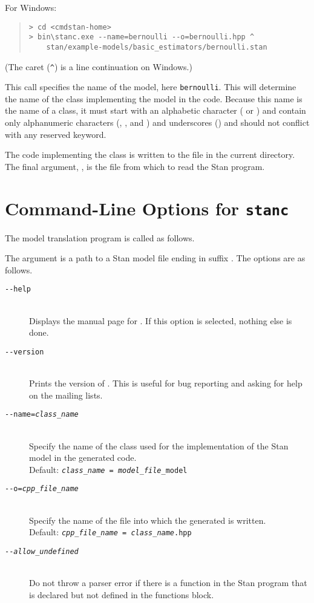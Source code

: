 For Windows:
%
\begin{quote}
\begin{Verbatim}[fontshape=sl]
> cd <cmdstan-home>
> bin\stanc.exe --name=bernoulli --o=bernoulli.hpp ^
    stan/example-models/basic_estimators/bernoulli.stan 
\end{Verbatim}
\end{quote}
%
(The caret (\Verb|^|) is a line continuation on Windows.)

This call specifies the name of the model, here {\tt bernoulli}.
This will determine the name of the class implementing the model in
the \Cpp code.  Because this name is the name of a \Cpp class, it must
start with an alphabetic character ( or ) and
contain only alphanumeric characters (, , and
) and underscores (\code{\_}) and should not conflict with
any \Cpp reserved keyword.  

The \Cpp code implementing the class is written to the file
 in the current directory.  The final argument,
, is the file from which to read the Stan
program.

\section{Command-Line Options for {\tt\bfseries stanc}}

The model translation program  is called as follows.
%
\begin{quote}
\end{quote}
%
The argument  is a path to a Stan model
file ending in suffix .  The options are as follows.
%
\begin{description}
%
\item[\tt {-}-help] 
\mbox{ } \\ 
Displays the manual page for \stanc.  If this option is selected,
nothing else is done.
%
\item[\tt {-}-version]
\mbox{ } \\ 
Prints the version of \stanc.  This is useful for bug reporting
and asking for help on the mailing lists.
%
\item[\tt {-}-name={\slshape class\_name}]
\mbox{ } \\ 
Specify the name of the class used for the implementation of the
Stan model in the generated \Cpp code.  
\\[2pt]
Default: {\tt {\slshape class\_name = model\_file}\_model}
%
\item[\tt {-}-o={\slshape cpp\_file\_name}]
\mbox{ } \\ 
Specify the name of the file into which the generated \Cpp is written.
\\[2pt]
Default: {\tt {\slshape cpp\_file\_name} = {\slshape class\_name}.hpp}
%
\item[\tt {-}-{\slshape allow\_undefined}]
\mbox{ } \\ 
Do not throw a parser error if there is a function in the Stan program
that is declared but not defined in the functions block.
%
\end{description}

